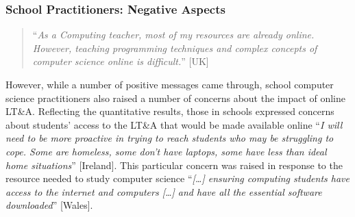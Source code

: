 \documentclass[sigconf]{acmart}
\begin{document}




\subsubsection{School Practitioners: Negative Aspects}

\begin{quotation}
``{\emph{As a Computing teacher, most of my resources are already
online. However, teaching programming techniques and complex concepts
of computer science online is difficult.}}''  [UK]
\end{quotation}

However, while a number of positive messages came through, school
computer science practitioners also raised a number of concerns about
the impact of online LT\&A. Reflecting the quantitative results, those
in schools expressed concerns about students’ access to the LT\&A that
would be made available online ``{\emph{I will need to be more
proactive in trying to reach students who may be struggling to
cope. Some are homeless, some don't have laptops, some have less than
ideal home situations}}'' [Ireland]. This particular concern was
raised in response to the resource needed to study computer science
``{\emph{[…] ensuring computing students have access to the internet
and computers […] and have all the essential software downloaded}}''
[Wales].
\end{document}

